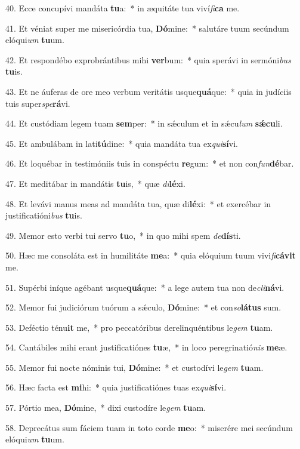 40. Ecce concupívi mandáta \textbf{tu}a:~*  in æquitáte tua viví\textit{fi}\textbf{ca} me.\

41. Et véniat super me misericórdia tua, \textbf{Dó}mine:~*  salutáre tuum secúndum elóqui\textit{um} \textbf{tu}um.\

42. Et respondébo exprobrántibus mihi \textbf{ver}bum:~*  quia sperávi in sermóni\textit{bus} \textbf{tu}is.\

43. Et ne áuferas de ore meo verbum veritátis usque\textbf{quá}que:~*  quia in judíciis tuis super\textit{spe}\textbf{rá}vi.\

44. Et custódiam legem tuam \textbf{sem}per:~*  in sǽculum et in sǽcu\textit{lum} \textbf{sǽ}\textbf{cu}li.\

45. Et ambulábam in lati\textbf{tú}dine:~*  quia mandáta tua ex\textit{qui}\textbf{sí}vi.\

46. Et loquébar in testimóniis tuis in conspéctu \textbf{re}gum:~*  et non con\textit{fun}\textbf{dé}bar.\

47. Et meditábar in mandátis \textbf{tu}is,~*  quæ \textit{di}\textbf{lé}xi.\

48. Et levávi manus meas ad mandáta tua, quæ di\textbf{lé}xi:~*  et exercébar in justificatióni\textit{bus} \textbf{tu}is.\

49. Memor esto verbi tui servo \textbf{tu}o,~*  in quo mihi spem \textit{de}\textbf{dís}ti.\

50. Hæc me consoláta est in humilitáte \textbf{me}a:~*  quia elóquium tuum vivi\textit{fi}\textbf{cá}\textbf{vit} me.\

51. Supérbi iníque agébant usque\textbf{quá}que:~*  a lege autem tua non de\textit{cli}\textbf{ná}vi.\

52. Memor fui judiciórum tuórum a sǽculo, \textbf{Dó}mine:~*  et con\textit{so}\textbf{lá}\textbf{tus} sum.\

53. Deféctio ténu\textbf{it} me,~*  pro peccatóribus derelinquéntibus le\textit{gem} \textbf{tu}am.\

54. Cantábiles mihi erant justificatiónes \textbf{tu}æ,~*  in loco peregrinatió\textit{nis} \textbf{me}æ.\

55. Memor fui nocte nóminis tui, \textbf{Dó}mine:~*  et custodívi le\textit{gem} \textbf{tu}am.\

56. Hæc facta est \textbf{mi}hi:~*  quia justificatiónes tuas ex\textit{qui}\textbf{sí}vi.\

57. Pórtio mea, \textbf{Dó}mine,~*  dixi custodíre le\textit{gem} \textbf{tu}am.\

58. Deprecátus sum fáciem tuam in toto corde \textbf{me}o:~*  miserére mei secúndum elóqui\textit{um} \textbf{tu}um.\

